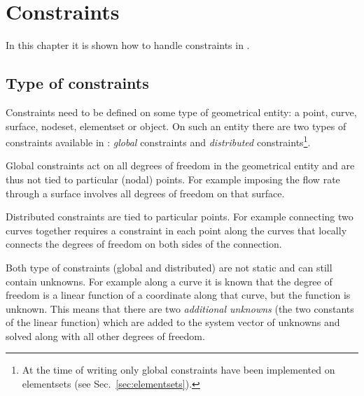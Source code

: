 
\chapter{Constraints}

\label{ch:constraints}

\def\chaptertitle{Constraints}
\def\headdate{18th February 2015}

In this chapter it is shown how to handle constraints in \tfem.

\section{Type of constraints}

Constraints need to be defined on some type of geometrical entity: 
a point, curve, surface, nodeset, elementset or object.
On such an entity
there are two types of constraints available in \tfem:
\emph{global} constraints and \emph{distributed} constraints\footnote{At the
time of writing
only global constraints
have been implemented 
on elementsets (see Sec.~\ref{sec:elementsets}).}.

Global
constraints act on all degrees of freedom in the geometrical entity and are
thus not tied to particular (nodal) points. For example imposing the flow rate
through a surface involves all degrees of freedom on that surface.

Distributed constraints are tied to particular points. For example connecting
two curves together requires a constraint in each point along the curves that
locally connects the degrees of freedom on both sides of the connection.

Both type of constraints (global and distributed) are not static and can
still contain unknowns. For example along a curve it is known that the degree
of freedom is a linear function of a coordinate along that curve, but the
function is unknown. This means that there are two \emph{additional unknowns}
(the two constants of the linear function) which are added to the system vector
of unknowns and solved along with all other degrees of freedom.


